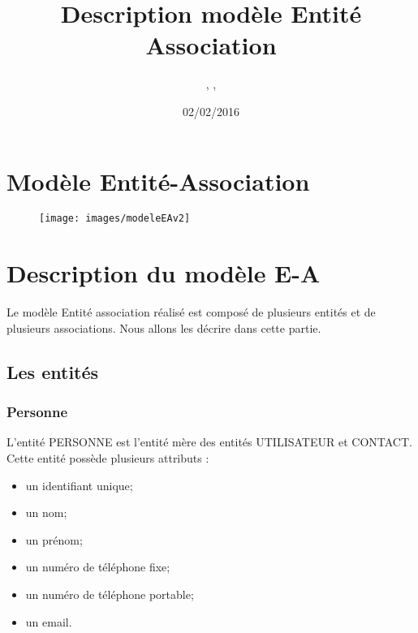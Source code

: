 \documentclass[asi, sansVersion]{picINSA}
\begin{document}
\title{Description modèle Entité Association}
\author{\Florian, \Mathieu, \Julie}
\date{02/02/2016} 

\maketitle

\tableofcontents

\chapter{Modèle Entité-Association}

\begin{landscape}
\begin{figure}
	\centering
	\texttt{[image: images/modeleEAv2]}
	\caption{\label{modele}}
\end{figure}
\end{landscape}

\chapter{Description du modèle E-A}

Le modèle Entité association réalisé est composé de plusieurs entités et de plusieurs associations. Nous allons les décrire dans cette partie. \\ 

\section{Les entités}

\subsection*{Personne}

L'entité PERSONNE est l'entité mère des entités UTILISATEUR et CONTACT. \\
Cette entité possède plusieurs attributs : 
\begin{itemize}
\item un identifiant unique;
\item un nom; %
\item un prénom; %
\item un numéro de téléphone fixe; %
\item un numéro de téléphone portable; %
\item un email. %
\end{itemize}
\end{document}
